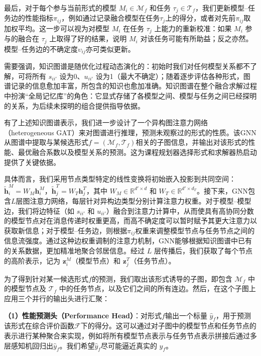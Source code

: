 \documentclass[../main.tex]{subfiles}
\begin{document}
最后，对于每个参与当前形式的模型 $M_i\in \mathcal{M}_f$ 和任务 $\tau_j \in \mathcal{T}_f$，我们更新模型--任务边的性能指标$\pi_{ij}$，例如通过记录融合模型在任务$\tau_j$上的得分，或者对先前$\pi_{ij}$取加权平均。这一步可以视为对模型 $M_i$ 在任务 $\tau_j$ 上能力的重新校准：如果 $M_i$ 参与的融合在 $\tau_j$ 上取得了好的结果，说明 $M_i$ 对该任务可能有所助益；反之亦然。模型--任务边的不确定度$\upsilon_{ij}$亦可类似更新。

需要强调，知识图谱是随优化过程动态演化的：初始时我们对任何模型关系都不了解，可将所有 $s_{ii'}$ 设为0、$u_{ii'}$ 设为1（最大不确定）；随着逐步评估各种形式，图谱记录的信息愈加丰富，所包含的知识也愈加准确。知识图谱在整个融合求解过程中扮演“全局记忆库”的角色：它显式存储了各模型之间、模型与任务之间已经探明的关系，为后续未探明的组合提供指导依据。


有了上述知识图谱表示，我们进一步设计了一个异构图注意力网络（heterogeneous GAT）来对图谱进行推理，预测未观察过的形式的性质。该GNN从图谱中提取与某候选形式$f=(\mathcal{M}_f,\mathcal{T}_f)$相关的子图信息，并输出对该形式的性能、最优融合系数以及模型关系的预测。这为课程规划器选择形式和求解器热启动提供了关键依据。

具体而言，我们采用节点类型特定的线性变换将初始嵌入投影到共同空间：$\tilde{\mathbf{h}}^{M}_i = W_M \mathbf{h}^{M}_i$，$\tilde{\mathbf{h}}^{T}_j = W_T \mathbf{h}^{T}_j$，其中 $W_M \in \mathbb{R}^{d'\times d}$ 和 $W_T \in \mathbb{R}^{d'\times d_T}$。接下来，GNN包含$L$层图注意力网络，每层针对异构边类型分别计算注意力权重。对于模型--模型边，我们将边特征（如 $s_{ii'}$ 和 $u_{ii'}$）融合到注意力计算中，从而使具有高协同分数的模型节点对在消息传递时权重更高，而高不确定度可以暂时赋予其更大注意力以获取新信息；对于模型--任务边，则根据$\pi_{ij}$权重来调整模型节点与任务节点之间的信息流强度。通过这种边权重调制的注意力机制，GNN能够根据知识图谱中已有的关系数据，更加精准地聚合邻居信息。经过 $L$ 层传播后，我们获取了每个节点的高阶表示，记为 $\mathbf{z}^M_i$（模型节点）和 $\mathbf{z}^T_j$（任务节点）。

为了得到针对某一候选形式$f$的预测，我们取出该形式诱导的子图，即包含 $\mathcal{M}_f$ 中的模型节点及 $\mathcal{T}_f$ 中的任务节点，以及它们之间的所有连边。然后，在这个子图上应用三个并行的输出头进行汇聚：

\textbf{（1）性能预测头（Performance Head）}：对形式$f$输出一个标量 $\hat{y}_f$，用于预测该形式在综合评价函数$\mathcal{F}$下的得分。这可以通过对子图中的模型节点和任务节点的表示进行某种聚合来实现，例如将所有模型节点表示与任务节点表示拼接后通过多层感知机回归出$\hat{y}_f$。我们希望$\hat{y}_f$尽可能逼近真实的 $y_f$。
\end{document}
